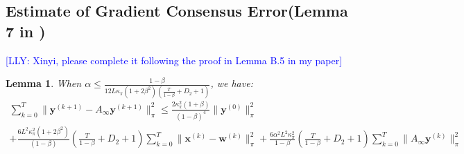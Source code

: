\documentclass[10pt]{article}
\newtheorem{lemma}[thm]{Lemma}
\newcommand{\vw}{{\mathbf{w}}}
\newcommand{\vx}{{\mathbf{x}}}
\newcommand{\vy}{{\mathbf{y}}}
\newcommand{\lly}[1]{\textcolor{blue}{[LLY: #1]}}
\begin{document}
\subsection{Estimate of Gradient Consensus Error(Lemma 7 in \cite{xi2018linear})}
\lly{Xinyi, please complete it following the proof in Lemma B.5 in my paper}
\begin{lemma}
When $\alpha\le \frac{1-\beta}{12L\kappa_\pi(1+2\beta^2)(\frac{T}{1-\beta}+D_2+1)}$, we have:
    \begin{align}
    \sum_{k=0}^T\|\vy^{(k+1)}-A_\infty\vy^{(k+1)}\|_\pi^2 \le \frac{2\kappa_\pi^2(1+\beta)}{(1-\beta)^4}\|\vy^{(0)}\|^2_\pi\nonumber \\+\frac{6L^2\kappa_\pi^2(1+2\beta^2)}{(1-\beta)}(\frac{T}{1-\beta}+D_2+1)\sum_{k=0}^T\|\vx^{(k)}-\vw^{(k)}\|^2_\pi+\frac{6\alpha^2L^2\kappa_\pi^2}{1-\beta}(\frac{T}{1-\beta}+D_2+1)\sum_{k=0}^T\|A_\infty\vy^{(k)}\|_\pi^2
\end{align}
\end{lemma}
\end{document}
